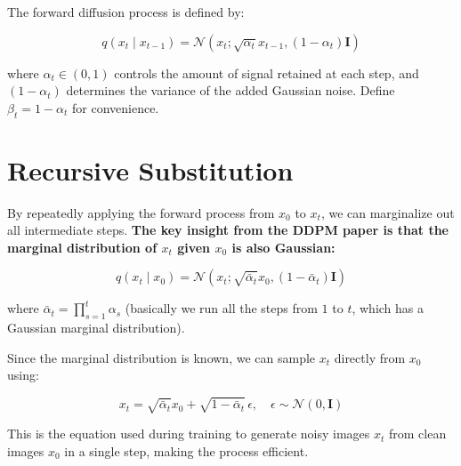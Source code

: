 \documentclass{article}
\author{}
\date{}
\begin{document}
The forward diffusion process is defined by:

\begin{equation}
q(x_t \mid x_{t-1}) = \mathcal{N}(x_t; \sqrt{\alpha_t} x_{t-1}, (1 - \alpha_t) \mathbf{I})
\end{equation}

where $\alpha_t \in (0, 1)$ controls the amount of signal retained at each step, and $(1 - \alpha_t)$ determines the variance of the added Gaussian noise. Define $\beta_t = 1 - \alpha_t$ for convenience.

\section*{Recursive Substitution}

By repeatedly applying the forward process from $x_0$ to $x_t$, we can marginalize out all intermediate steps. \textbf{The key insight from the DDPM paper is that the marginal distribution of $x_t$ given $x_0$ is also Gaussian:}

\begin{equation}
q(x_t \mid x_0) = \mathcal{N}(x_t; \sqrt{\bar{\alpha}_t} x_0, (1 - \bar{\alpha}_t) \mathbf{I})
\end{equation}

where $\bar{\alpha}_t = \prod_{s=1}^t \alpha_s$ (basically we run all the steps from $1$ to $t$, which has a Gaussian marginal distribution).

Since the marginal distribution is known, we can sample $x_t$ directly from $x_0$ using:

\begin{equation}
x_t = \sqrt{\bar{\alpha}_t} x_0 + \sqrt{1 - \bar{\alpha}_t} \, \epsilon, \quad \epsilon \sim \mathcal{N}(0, \mathbf{I})
\end{equation}

This is the equation used during training to generate noisy images $x_t$ from clean images $x_0$ in a single step, making the process efficient.
\end{document}
